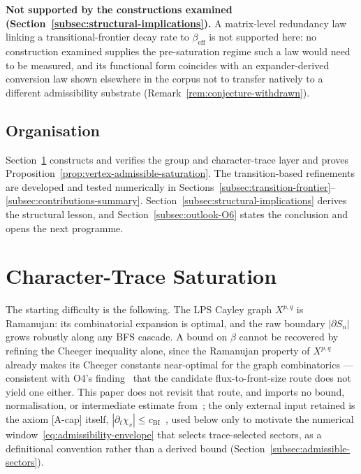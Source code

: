 \documentclass[11pt,a4paper]{article}
\theoremstyle{plain}
\theoremstyle{definition}
\theoremstyle{remark}
\newcommand{\betaeff}{\beta_{\mathrm{eff}}}
\begin{document}
      \textbf{Not supported by the constructions examined (Section~\ref{subsec:structural-implications}).}
      A matrix-level redundancy law linking a transitional-frontier decay rate to $\betaeff$ is not
      supported here: no construction examined supplies the pre-saturation regime such a law would
      need to be measured, and its functional form coincides with an expander-derived conversion
      law shown elsewhere in the corpus not to transfer natively to a different admissibility
      substrate (Remark~\ref{rem:conjecture-withdrawn}).

    \subsection{Organisation}

      Section~\ref{sec:admissible-frontier} constructs and verifies the group and character-trace
      layer and proves Proposition~\ref{prop:vertex-admissible-saturation}.
      The transition-based refinements are developed and tested numerically in
      Sections~\ref{subsec:transition-frontier}--\ref{subsec:contributions-summary}.
      Section~\ref{subsec:structural-implications} derives the structural lesson, and
      Section~\ref{subsec:outlook-O6} states the conclusion and opens the next programme.

  \section{Character-Trace Saturation}
    \label{sec:admissible-frontier}


    The starting difficulty is the following.
    The LPS Cayley graph $X^{p,q}$ is Ramanujan: its combinatorial expansion is optimal, and the
    raw boundary $|\partial S_n|$ grows robustly along any BFS cascade.
    A bound on $\beta$ cannot be recovered by refining the Cheeger inequality alone, since the
    Ramanujan property of $X^{p,q}$ already makes its Cheeger constants near-optimal for the graph
    combinatorics --- consistent with O4's finding~\cite{Beau2026a8} that the candidate
    flux-to-front-size route does not yield one either.
    This paper does not revisit that route, and imports no bound, normalisation, or intermediate
    estimate from~\cite{Beau2026a8}; the only external input retained is the axiom [A-cap] itself,
    $|\partial_t \chi_v| \le c_{\mathrm{BI}}$~\cite{Beau2026c}, used below only to motivate the
    numerical window~\eqref{eq:admissibility-envelope} that selects trace-selected sectors,
    as a definitional convention rather than a derived bound (Section~\ref{subsec:admissible-sectors}).
\end{document}
